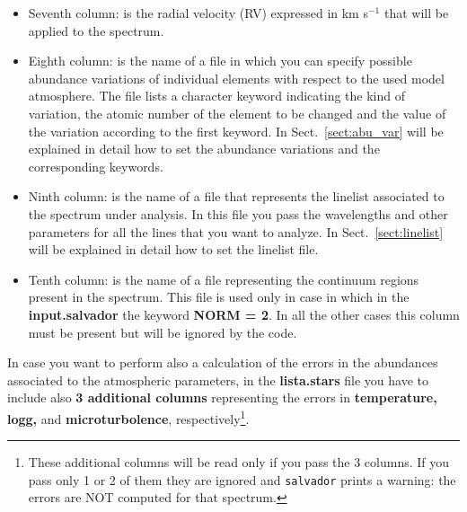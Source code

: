 \documentclass[modern]{aastex701}
\begin{document}
\begin{itemize}
    The values from second to sixth columns will be read by \texttt{K2} to compute the proper synthetic associated to the spectrum under analysis. 
    \item Seventh column: is the radial velocity (RV) expressed in km s$^{-1}$ that will be applied to the spectrum. 
    \item Eighth column: is the name of a file in which you can specify possible abundance variations of individual elements with respect to the used model atmosphere. The file lists a character keyword indicating the kind of variation, the atomic number of the element to be changed and the value of the variation according to the first keyword. In Sect.~\ref{sect:abu_var} will be explained in detail how to set the abundance variations and the corresponding keywords. 
    \item Ninth column: is the name of a file that represents the linelist associated to the spectrum under analysis. In this file you pass the wavelengths and other parameters for all the lines that you want to analyze. In Sect.~\ref{sect:linelist} will be explained in detail how to set the linelist file.
    \item Tenth column: is the name of a file representing the continuum regions present in the spectrum. This file is used only in case in which in the \textbf{input.salvador} the keyword {\bf NORM = 2}. In all the other cases this column must be present but will be ignored by the code. 
\end{itemize}

In case you want to perform also a calculation of the errors in the abundances associated to the atmospheric parameters, in the \textbf{lista.stars} file you have to include also \textbf{3 additional columns} representing the errors in {\bf temperature, logg,} and {\bf microturbolence}, respectively\footnote{These additional columns will be read only if you pass the 3 columns. If you pass only 1 or 2 of them they are ignored and \texttt{salvador} prints a warning: the errors are NOT computed for that spectrum.}. 

\end{document}
